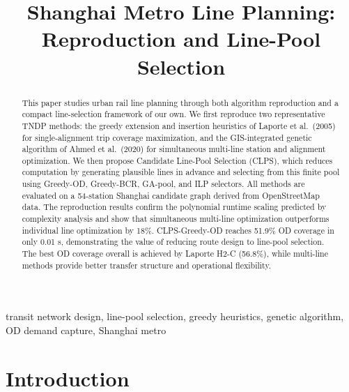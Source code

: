 \documentclass[conference]{IEEEtran}
\begin{document}
\title{Shanghai Metro Line Planning:\\
Reproduction and Line-Pool Selection}

\author{
}

\maketitle

\begin{abstract}
This paper studies urban rail line planning through both algorithm
reproduction and a compact line-selection framework of our own. We first
reproduce two representative TNDP methods: the greedy extension and
insertion heuristics of Laporte et al.\ (2005) for single-alignment trip
coverage maximization, and the GIS-integrated genetic algorithm of Ahmed
et al.\ (2020) for simultaneous multi-line station and alignment
optimization. We then propose Candidate Line-Pool Selection (CLPS), which
reduces computation by generating plausible lines in advance and selecting
from this finite pool using Greedy-OD, Greedy-BCR, GA-pool, and ILP
selectors. All methods are evaluated on a 54-station Shanghai candidate
graph derived from OpenStreetMap data. The reproduction results confirm
the polynomial runtime scaling predicted by complexity analysis and show
that simultaneous multi-line optimization outperforms individual line
optimization by 18\%. CLPS-Greedy-OD reaches 51.9\% OD coverage in only
0.01 s, demonstrating the value of reducing route design to line-pool
selection. The best OD coverage overall is achieved by Laporte H2-C
(56.8\%), while multi-line methods provide better transfer structure and
operational flexibility.
\end{abstract}

\begin{IEEEkeywords}
transit network design, line-pool selection, greedy heuristics, genetic algorithm, OD demand capture, Shanghai metro
\end{IEEEkeywords}

\section{Introduction}
\end{document}
